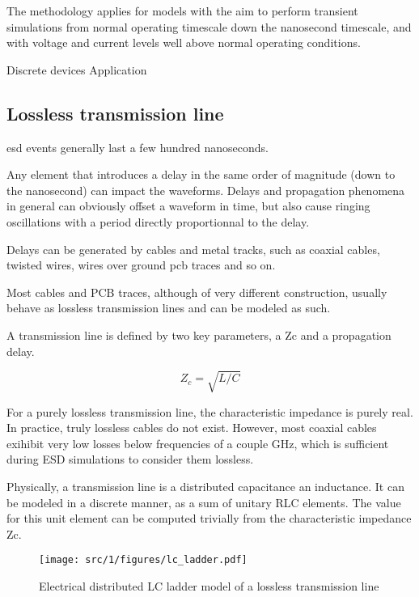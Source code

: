 The methodology applies for models with the aim to perform transient simulations from normal operating timescale down the nanosecond timescale, and with voltage and current levels well above normal operating conditions.

Discrete devices
Application

\subsection{Lossless transmission line}

\gls{esd} events generally last a few hundred nanoseconds.

Any element that introduces a delay in the same order of magnitude (down to the nanosecond) can impact the waveforms.
Delays and propagation phenomena in general can obviously offset a waveform in time,
but also cause ringing oscillations with a period directly proportionnal to the delay.

Delays can be generated by cables and metal tracks, such as coaxial cables, twisted wires, wires over ground \gls{pcb} traces and so on.

Most cables and PCB traces, although of very different construction, usually behave as lossless transmission lines and can be modeled as such.

A transmission line is defined by two key parameters, a \gls{Zc} and a propagation delay.

\begin{equation}
Z_{c} = \sqrt{L/C}
\end{equation}

For a purely lossless transmission line, the characteristic impedance is purely real.
In practice, truly lossless cables do not exist.
However, most coaxial cables exihibit very low losses below frequencies of a couple GHz, which is sufficient during ESD simulations to consider them lossless.

Physically, a transmission line is a distributed capacitance an inductance.
It can be modeled in a discrete manner, as a sum of unitary RLC elements.
The value for this unit element can be computed trivially from the characteristic impedance \gls{Zc}.

\begin{figure}[!h]
  \centering
  \texttt{[image: src/1/figures/lc\_ladder.pdf]}
  \caption{Electrical distributed LC ladder model of a lossless transmission line}
  \label{fig:dis-line-model}
\end{figure}

